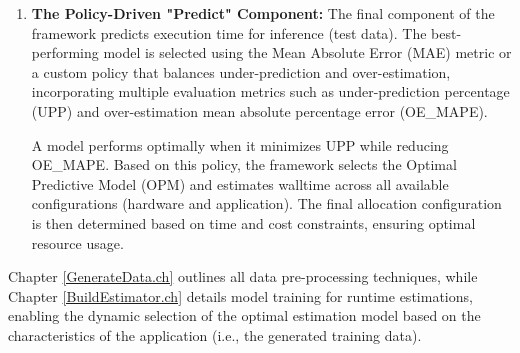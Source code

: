 \begin{enumerate}
  The build component pre-processes training data by removing redundant features and combining correlated features to reduce dimensionality and enhance predictive model accuracy. Different regression models—Multi-Layer Perceptron (MLP), Decision Tree Regressor (DTR), and Simple Neural Network Regressor (NNR)—are trained using pre-processed data with various combinations of training datasets (SD, SD+n\%FS) and stored for inference.  

  The models are continually trained with incremental FS sample generation (\%FS), simulating human learning. To address SD-FS imbalances, FS data is upsampled, and predictions are scaled against the FS validation dataset using an adjustment factor.

  \item \textbf{The Policy-Driven "Predict" Component:}  
  The final component of the framework predicts execution time for inference (test data). The best-performing model is selected using the Mean Absolute Error (MAE) metric or a custom policy that balances under-prediction and over-estimation, incorporating multiple evaluation metrics such as under-prediction percentage (UPP) and over-estimation mean absolute percentage error (OE\_MAPE).  

  A model performs optimally when it minimizes UPP while reducing OE\_MAPE. Based on this policy, the framework selects the Optimal Predictive Model (OPM) and estimates walltime across all available configurations (hardware and application). The final allocation configuration is then determined based on time and cost constraints, ensuring optimal resource usage.

\end{enumerate}

Chapter \ref{GenerateData.ch} outlines all data pre-processing techniques, while Chapter \ref{BuildEstimator.ch} details model training for runtime estimations, enabling the dynamic selection of the optimal estimation model based on the characteristics of the application (i.e., the generated training data).




